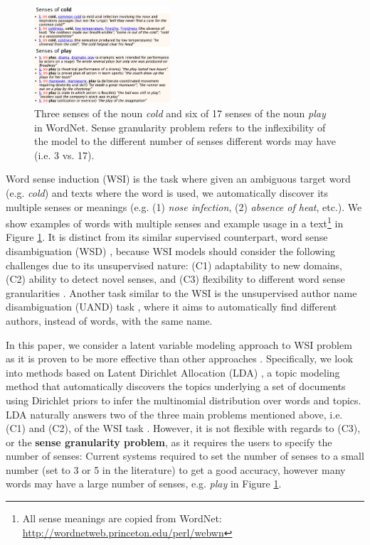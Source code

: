 \documentclass[letterpaper]{article} %
\begin{document}
\begin{figure}
    \centering
    \includegraphics[width=0.45\textwidth]{example_senses}
    \caption{Three senses of the noun \textit{cold} and six of 17 senses of the noun \textit{play} in WordNet. Sense granularity problem refers to the inflexibility of the model to the different number of senses different words may have (i.e. 3 vs. 17).}
    \label{fig:wsi_example}
\end{figure}

Word sense induction (WSI) is the task where given an ambiguous target word (e.g. \textit{cold}) and texts where the word is used, we automatically discover its multiple senses or meanings (e.g. (1) \textit{nose infection}, (2) \textit{absence of heat}, etc.). We show examples of words with multiple senses and example usage in a text\footnote{All sense meanings are copied from WordNet: \url{http://wordnetweb.princeton.edu/perl/webwn}} in Figure \ref{fig:wsi_example}. It is distinct from its similar supervised counterpart, word sense disambiguation (WSD) \cite{stevenson2003word}, because WSI models should consider the following challenges due to its unsupervised nature: (C1) adaptability to new domains, (C2) ability to detect novel senses, and (C3) flexibility to different word sense granularities \cite{jurgens2013semeval}. Another task similar to the WSI is the unsupervised author name disambiguation (UAND) task \cite{song2007efficient}, where it aims to automatically find different authors, instead of words, with the same name.

In this paper, we consider a latent variable modeling approach to WSI problem as it is proven to be more effective than other approaches \cite{chang2014inducing,komninos2016structured}. Specifically, we look into methods based on Latent Dirichlet Allocation (LDA) \cite{blei2003latent}, a topic modeling method that automatically discovers the topics underlying a set of documents using Dirichlet priors to infer the multinomial distribution over words and topics. LDA naturally answers two of the three main problems mentioned above, i.e. (C1) and (C2), of the WSI task \cite{brody2009bayesian}. However, it is not flexible with regards to (C3), or the \textbf{sense granularity problem}, as it requires the users to specify the number of senses: Current systems \cite{wang2015sense,chang2014inducing} required to set the number of senses to a small number (set to 3 or 5 in the literature) to get a good accuracy, however many words may have a large number of senses, e.g. \textit{play} in Figure \ref{fig:wsi_example}.
\end{document}
